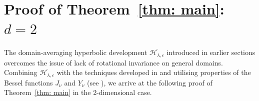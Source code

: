 \documentclass[11pt,a4paper,english,reqno]{amsart}
\theoremstyle{plain}
\newcommand{\e}{\epsilon}
\newcommand{\1}{\mathbbm{1}}
\begin{document}
\section{Proof of Theorem~\ref{thm: main}: $d=2$}
\label{sec: proof of main thm}



The domain-averaging hyperbolic development $\overline{\mathcal{H}_{\lambda, \e}}$ introduced in earlier sections overcomes the issue of lack of rotational invariance on general domains. Combining $\overline{\mathcal{H}_{\lambda, \e}}$ with the techniques developed in \cite{boedihardjo2021expected,cl} and utilising properties of the Bessel functions $J_\nu$ and $Y_\nu$ (see \cite{as,lozier2003nist}),  we arrive at the following proof of Theorem~\ref{thm: main} in the 2-dimensional case.




\end{document}
